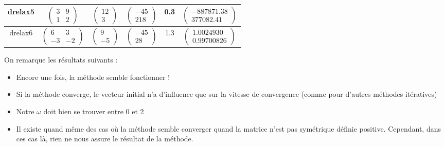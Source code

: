 \documentclass{article}
\theoremstyle{mes_theoremes}
\begin{document}
\begin{tabular}{|c|c|c|c|c|c|}
\hline
drelax5 & $\left(\begin{matrix} 3 & 9 \\ 1 & 2 \end{matrix}\right)$ & $\left(\begin{matrix} 12\\ 3\end{matrix}\right)$ &   $\left(\begin{matrix} -45\\ 218\end{matrix}\right)$ & 0.3 &  $\left(\begin{matrix}  -887871.38 \\   377082.41    \end{matrix}\right)$  \\
\hline
drelax6 & $\left(\begin{matrix} 6 & 3 \\ -3 & -2 \end{matrix}\right)$ & $\left(\begin{matrix} 9\\ -5\end{matrix}\right)$ &   $\left(\begin{matrix} -45\\ 28\end{matrix}\right)$ & 1.3 &  $\left(\begin{matrix}  1.0024930  \\   0.99700826    \end{matrix}\right)$  \\
\hline
\end{tabular}

On remarque les résultats suivants :
\begin{itemize}
\item Encore une fois, la méthode semble fonctionner !
\item Si la méthode converge, le vecteur initial n'a d'influence que sur la vitesse de convergence (comme pour d'autres méthodes itératives)
\item Notre $\omega$ doit bien se trouver entre 0 et 2
\item Il existe quand même des cas où la méthode semble converger quand la matrice n'est pas symétrique définie positive. Cependant, dans ces cas là, rien ne nous assure le résultat de la méthode.
\end{itemize}
\end{document}
